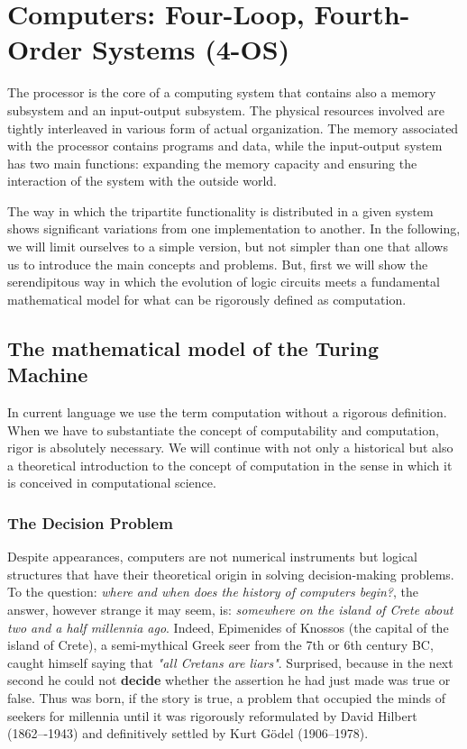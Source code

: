\chapter{Computers: Four-Loop, Fourth-Order Systems (4-OS)}\label{lect6}
\localtoc

The processor is the core of a computing system that contains also a memory subsystem and an input-output subsystem. The physical resources involved are tightly interleaved in various form of actual organization. The memory associated with the processor contains programs and data, while the input-output system has two main functions: expanding the memory capacity and ensuring the interaction of the system with the outside world.


The way in which the tripartite functionality is distributed in a given system shows significant variations from one implementation to another. In the following, we will limit ourselves to a simple version, but not simpler than one that allows us to introduce the main concepts and problems. But, first we will show the serendipitous way in which the evolution of logic circuits meets a fundamental mathematical model for what can be rigorously defined as computation.

\section{The mathematical model of the Turing Machine}

In current language we use the term computation without a rigorous definition. When we have to substantiate the concept of computability and computation, rigor is absolutely necessary. We will continue with not only a historical but also a theoretical introduction to the concept of computation in the sense in which it is conceived in computational science.

\subsection{The Decision Problem}

Despite appearances, computers are not numerical instruments but logical structures that have their theoretical origin in solving decision-making problems. To the question: {\em where and when does the history of computers begin?}, the answer, however strange it may seem, is: {\em somewhere on the island of Crete about two and a half millennia ago}. Indeed, Epimenides of Knossos (the capital of the island of Crete), a semi-mythical Greek seer from the 7th or 6th century BC, caught himself saying that {\em "all Cretans are liars"}. Surprised, because in the next second he could not {\bf decide} whether the assertion he had just made was true or false. Thus was born, if the story is true, a problem that occupied the minds of seekers for millennia until it was rigorously reformulated by David Hilbert (1862–-1943) and definitively settled by Kurt G\" odel (1906--1978).

